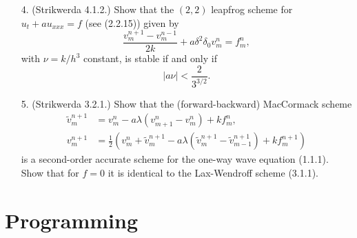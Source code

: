 \documentclass{article}
\providecommand{\abs}[1]{\left\lvert#1\right\rvert}
\begin{document}
\begin{itemize}
\item[4.] (Strikwerda 4.1.2.) Show that the $(2,2)$ leapfrog scheme for $u_t + a u_{xxx} = f$ (see (2.2.15)) given by
\begin{equation*}
\frac{v^{n+1}_m - v^{n-1}_m}{2k} + a \delta^2 \delta_0 v^n_m = f^n_m,
\end{equation*}
with $\nu = k / h^3$ constant, is stable if and only if
\begin{equation*}
\abs{a \nu} < \frac{2}{3^{3/2}}.
\end{equation*}

\item[5.] (Strikwerda 3.2.1.) Show that the (forward-backward) MacCormack scheme
\begin{align*}
\tilde{v}^{n+1}_m & = v^n_m - a \lambda \left( v^n_{m+1} - v^n_m \right) + k f^n_m, \\
v^{n+1}_m & = \frac{1}{2} \left( v^n_m + \tilde{v}^{n+1}_m - a \lambda \left( \tilde{v}^{n+1}_m - \tilde{v}^{n+1}_{m-1} \right) + k f^{n+1}_m \right)
\end{align*}
is a second-order accurate scheme for the one-way wave equation (1.1.1). Show that for $f = 0$ it is identical to the Lax-Wendroff scheme (3.1.1).

\end{itemize}

\section{Programming}
\end{document}
